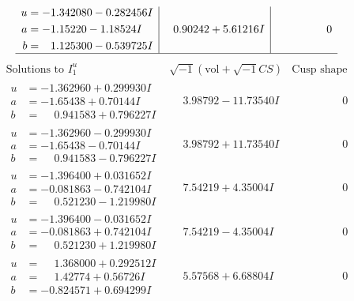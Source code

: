 \documentclass[1p]{elsarticle_modified}
\theoremstyle{definition}
\newcommand{\I}{\sqrt{-1}}
\begin{document}
$$\begin{array}{c|c|c}
\begin{aligned}
u &= -1.342080 - 0.282456 I \\
a &= -1.15220 - 1.18524 I \\
b &= \phantom{-}1.125300 - 0.539725 I\end{aligned}
 & \phantom{-}0.90242 + 5.61216 I & \phantom{-0.000000 } 0\\
 \hline 
 \end{array}$$\newpage$$\begin{array}{c|c|c}  
\text{Solutions to }I^u_{1}& \I (\text{vol} + \sqrt{-1}CS) & \text{Cusp shape}\\
 \hline 
\begin{aligned}
u &= -1.362960 + 0.299930 I \\
a &= -1.65438 + 0.70144 I \\
b &= \phantom{-}0.941583 + 0.796227 I\end{aligned}
 & \phantom{-}3.98792 - 11.73540 I & \phantom{-0.000000 } 0 \\ \hline\begin{aligned}
u &= -1.362960 - 0.299930 I \\
a &= -1.65438 - 0.70144 I \\
b &= \phantom{-}0.941583 - 0.796227 I\end{aligned}
 & \phantom{-}3.98792 + 11.73540 I & \phantom{-0.000000 } 0 \\ \hline\begin{aligned}
u &= -1.396400 + 0.031652 I \\
a &= -0.081863 - 0.742104 I \\
b &= \phantom{-}0.521230 - 1.219980 I\end{aligned}
 & \phantom{-}7.54219 + 4.35004 I & \phantom{-0.000000 } 0 \\ \hline\begin{aligned}
u &= -1.396400 - 0.031652 I \\
a &= -0.081863 + 0.742104 I \\
b &= \phantom{-}0.521230 + 1.219980 I\end{aligned}
 & \phantom{-}7.54219 - 4.35004 I & \phantom{-0.000000 } 0 \\ \hline\begin{aligned}
u &= \phantom{-}1.368000 + 0.292512 I \\
a &= \phantom{-}1.42774 + 0.56726 I \\
b &= -0.824571 + 0.694299 I\end{aligned}
 & \phantom{-}5.57568 + 6.68804 I & \phantom{-0.000000 } 0 \\ \hline\begin{aligned}

\end{aligned}
\end{array}$$
\end{document}

